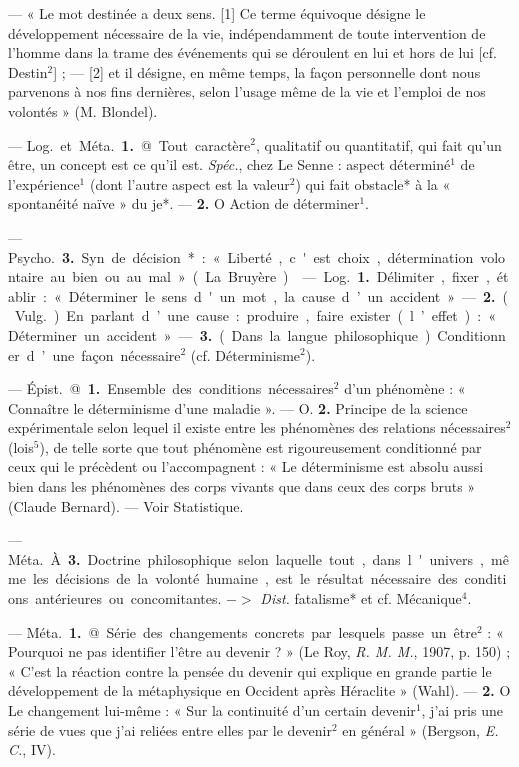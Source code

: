 \begin{itemize}[leftmargin=1cm, label=, itemsep=1pt]
 — « Le mot destinée a deux
sens. [1] Ce terme équivoque désigne le développement nécessaire
de la vie, indépendamment de toute
intervention de l’homme dans la
trame des événements qui se déroulent en lui et hors de lui [cf. Destin$^2$] ;
— [2] et il désigne, en même temps,
la façon personnelle dont nous parvenons à nos fins dernières, selon
l'usage même de la vie et l'emploi
de nos volontés » (M. Blondel).

 — \si{Log.} et \si{Méta.} {\bf 1.}
@ Tout caractère$^2$, qualitatif ou quantitatif, qui fait qu'un être, un concept est ce qu'il est. {\it Spéc.}, chez Le
Senne : aspect déterminé$^1$ de l’expérience$^1$ (dont l’autre aspect est la
valeur$^2$) qui fait obstacle* à la
« spontanéité naïve » du je*. —
 {\bf 2.} O Action de déterminer$^1$.

— \si{Psycho.} {\bf 3.} Syn. de décision* :
« Liberté, c'est choix, détermination volontaire au bien ou au mal »
(La Bruyère).

 — \si{Log.} {\bf 1.} Délimiter,
fixer, établir : « Déterminer le sens
d'un mot, la cause d’un accident ».
— {\bf 2.} (\si{Vulg.}). En parlant d’une
cause : produire, faire exister
(l’effet) : « Déterminer un accident ».
— {\bf 3.} (Dans la langue philosophique). Conditionner d’une façon nécessaire$^2$ (cf. Déterminisme$^2$).

 — \si{Épist.} @ {\bf 1.} Ensemble des conditions nécessaires$^2$
d’un phénomène : « Connaître le
déterminisme d’une maladie ». —
O. {\bf 2.} Principe de la science expérimentale selon lequel il existe entre
les phénomènes des relations nécessaires$^2$ (lois$^5$), de telle sorte que tout
phénomène est rigoureusement conditionné par ceux qui le précèdent
ou l’accompagnent : « Le déterminisme est absolu aussi bien dans les
phénomènes des corps vivants que
dans ceux des corps bruts » (Claude
Bernard). — Voir Statistique.

— \si{Méta.} À {\bf 3.} Doctrine philosophique selon laquelle tout, dans
l'univers, même les décisions de la
volonté humaine, est le résultat nécessaire des conditions antérieures
ou concomitantes. $->$ {\it Dist.} fatalisme* et cf. Mécanique$^4$.

 — \si{Méta.} {\bf 1.} @ Série des changements concrets par lesquels passe
un être$^2$ : « Pourquoi ne pas identifier l’être au devenir ? » (Le Roy,
{\it R. M. M.}, 1907, p. 150) ; « C’est la
réaction contre la pensée du devenir
qui explique en grande partie le
développement de la métaphysique
en Occident après Héraclite »
(Wahl). — {\bf 2.} O Le changement lui-même : « Sur la continuité d’un certain devenir$^1$, j'ai pris une série de
vues que j'ai reliées entre elles par
le devenir$^2$ en général » (Bergson,
{\it E. C.}, IV).


\end{itemize}
